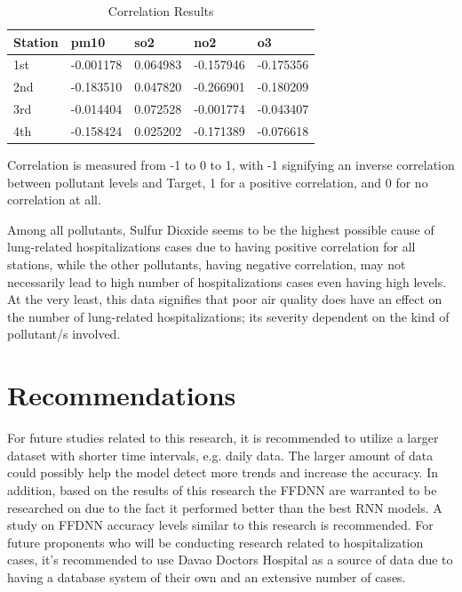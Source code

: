 ﻿\documentclass[10pt,11pt,12pt,oneside]{book}
\begin{document}
\begin{table}[H]
    \centering
    \begin{tabular}{|l|l|l|l|l|}
\toprule
Station    & pm10  & so2   & no2   & o3    \\
\hline
1st  & -0.001178 & 0.064983   & -0.157946    & -0.175356   \\
\hline
2nd  & -0.183510 & 0.047820 & -0.266901   & -0.180209   \\
\hline
3rd  & -0.014404 & 0.072528  & -0.001774 & -0.043407  \\
\hline
4th & -0.158424 & 0.025202 & -0.171389  & -0.076618    \\
\bottomrule
\end{tabular}
\caption{Correlation Results}
\label{table:correlation}
\end{table}

Correlation is measured from -1 to 0 to 1, with -1 signifying an inverse correlation between pollutant levels and Target, 1 for a positive correlation, and 0 for no correlation at all.

Among all pollutants, Sulfur Dioxide seems to be the highest possible cause of lung-related hospitalizations cases due to having positive correlation for all stations, while the other pollutants, having negative correlation, may not necessarily lead to high number of hospitalizations cases even having high levels. At the very least, this data signifies that poor air quality does have an effect on the number of lung-related hospitalizations; its severity dependent on the kind of pollutant/s involved.


\section{Recommendations}
For future studies related to this research, it is recommended to utilize a larger dataset with shorter time intervals, e.g. daily data. The larger amount of data could possibly help the model detect more trends and increase the accuracy. 
In addition, based on the results of this research the FFDNN are warranted to be researched on due to the fact it performed better than the best RNN models. A study on FFDNN accuracy levels similar to this research is recommended.
For future proponents who will be conducting research related to hospitalization cases, it's recommended to use Davao Doctors Hospital as a source of data due to having a database system of their own and an extensive number of cases.
    
    
\end{document}
